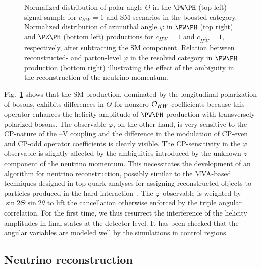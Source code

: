 \documentclass[a4paper,11pt]{article}
\renewcommand{\PV}{{{{V}}}\xspace}
\begin{document}
\begin{figure}[hbtp]
\begin{center}
\end{center}
\caption{
Normalized distribution of polar angle $\Theta$ in the $\PW\PH$ (top left) signal sample for $c_{HW}=1$ and SM scenarios in the boosted category. 
Normalized distribution of azimuthal angle $\varphi$ in  $\PW\PH$  (top right) and $\PZ\PH$ (bottom left) productions for $c_{HW}=1$ and $c_{H\widetilde{W}}=1$, respectively, after subtracting the SM component.%
Relation between reconstructed- and parton-level $\varphi$ in the resolved category in $\PW\PH$ production (bottom right) illustrating the effect of the ambiguity in the reconstruction of the neutrino momentum.
}
\label{fig:angles}
\end{figure}
Fig.~\ref{fig:angles} shows that
the SM production, dominated by the longitudinal polarization of \PW bosons, exhibits differences in $\Theta$ for nonzero ${\cal O}_{HW}$ coefficients because this operator enhances the helicity amplitude of $\PW\PH$ production with transversely polarized {\PW} bosons. 
The observable $\varphi$, on the other hand, is very sensitive to the CP-nature of the \PH--\PV coupling and the difference in the modulation of CP-even and CP-odd operator coefficients is clearly visible.  
The CP-sensitivity in the $\varphi$ observable is slightly affected by the ambiguities introduced by the unknown $z$-component of the neutrino momentum. 
This necessitates the development of an algorithm for neutrino reconstruction, possibly similar to the MVA-based techniques designed in top quark analyses for assigning reconstructed objects to particles produced in the hard interaction~\cite{CMS:2019esx}.
The $\varphi$ observable is weighted by $\sin2\Theta\sin2\theta$ to lift the cancellation otherwise enforced by the triple angular correlation. 
For the first time, we thus resurrect the interference of the helicity amplitudes in \PH final states at the detector level. 
It has been checked that the angular variables are modeled well by the simulations in control regions.

\subsection{Neutrino reconstruction}
\label{sec:neu_reco}
\end{document}
